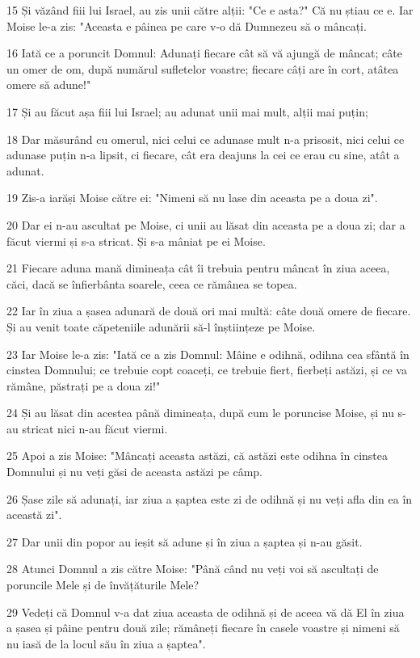 \par 15 Și văzând fiii lui Israel, au zis unii către alții: "Ce e asta?" Că nu știau ce e. Iar Moise le-a zis: "Aceasta e pâinea pe care v-o dă Dumnezeu să o mâncați.
\par 16 Iată ce a poruncit Domnul: Adunați fiecare cât să vă ajungă de mâncat; câte un omer de om, după numărul sufletelor voastre; fiecare câți are în cort, atâtea omere să adune!"
\par 17 Și au făcut așa fiii lui Israel; au adunat unii mai mult, alții mai puțin;
\par 18 Dar măsurând cu omerul, nici celui ce adunase mult n-a prisosit, nici celui ce adunase puțin n-a lipsit, ci fiecare, cât era deajuns la cei ce erau cu sine, atât a adunat.
\par 19 Zis-a iarăși Moise către ei: "Nimeni să nu lase din aceasta pe a doua zi".
\par 20 Dar ei n-au ascultat pe Moise, ci unii au lăsat din aceasta pe a doua zi; dar a făcut viermi și s-a stricat. Și s-a mâniat pe ei Moise.
\par 21 Fiecare aduna mană dimineața cât îi trebuia pentru mâncat în ziua aceea, căci, dacă se înfierbânta soarele, ceea ce rămânea se topea.
\par 22 Iar în ziua a șasea adunară de două ori mai multă: câte două omere de fiecare. Și au venit toate căpeteniile adunării să-l înștiințeze pe Moise.
\par 23 Iar Moise le-a zis: "Iată ce a zis Domnul: Mâine e odihnă, odihna cea sfântă în cinstea Domnului; ce trebuie copt coaceți, ce trebuie fiert, fierbeți astăzi, și ce va rămâne, păstrați pe a doua zi!"
\par 24 Și au lăsat din acestea până dimineața, după cum le poruncise Moise, și nu s-au stricat nici n-au făcut viermi.
\par 25 Apoi a zis Moise: "Mâncați aceasta astăzi, că astăzi este odihna în cinstea Domnului și nu veți găsi de aceasta astăzi pe câmp.
\par 26 Șase zile să adunați, iar ziua a șaptea este zi de odihnă și nu veți afla din ea în această zi".
\par 27 Dar unii din popor au ieșit să adune și în ziua a șaptea și n-au găsit.
\par 28 Atunci Domnul a zis către Moise: "Până când nu veți voi să ascultați de poruncile Mele și de învățăturile Mele?
\par 29 Vedeți că Domnul v-a dat ziua aceasta de odihnă și de aceea vă dă El în ziua a șasea și pâine pentru două zile; rămâneți fiecare în casele voastre și nimeni să nu iasă de la locul său în ziua a șaptea".

